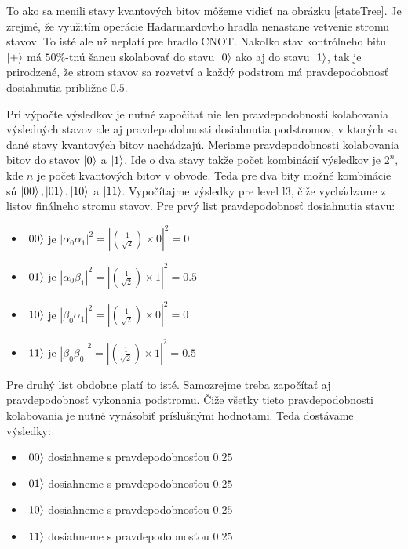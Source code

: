 To ako sa menili stavy kvantových bitov môžeme vidieť na obrázku
\ref{stateTree}. Je zrejmé, že využitím operácie Hadarmardovho hradla nenastane
vetvenie stromu stavov. To isté ale už neplatí pre hradlo CNOT. Nakoľko stav
kontrólneho bitu \(\ket{+}\) má \(50\%\)-tnú šancu skolabovať do stavu 
\(\ket{0}\) ako aj do stavu \(\ket{1}\), tak je prirodzené, že strom stavov 
sa rozvetví a každý podstrom má pravdepodobnosť dosiahnutia približne \(0.5\).

Pri výpočte výsledkov je nutné započítať nie len pravdepodobnosti kolabovania
výsledných stavov ale aj pravdepodobnosti dosiahnutia podstromov, v ktorých 
sa dané stavy kvantových bitov nachádzajú. Meriame pravdepodobnosti kolabovania
bitov do stavov \(\ket{0}\) a \(\ket{1}\). Ide o dva stavy takže počet
kombinácií výsledkov je \(2^n\), kde \(n\) je počet kvantových bitov v obvode.
Teda pre dva bity možné kombinácie sú \(\ket{00}, \ket{01}, \ket{10}\) a
\(\ket{11}\). Vypočítajme výsledky pre level l3, čiže vychádzame z listov 
finálneho stromu stavov. Pre prvý list pravdepodobnosť dosiahnutia stavu:

\begin{itemize}
    \item \(\ket{00}\) je \(|\alpha_0\alpha_1|^2 = |\binom{1}{\sqrt{2}} \times
0|^2 = 0\)
    \item \(\ket{01}\) je \(|\alpha_0\beta_1|^2 = |\binom{1}{\sqrt{2}} \times
1|^2 = 0.5\)
    \item \(\ket{10}\) je \(|\beta_0\alpha_1|^2 = |\binom{1}{\sqrt{2}} \times
0|^2 = 0\)
    \item \(\ket{11}\) je \(|\beta_0\beta_0|^2 = |\binom{1}{\sqrt{2}} \times
1|^2 = 0.5\)
\end{itemize}

Pre druhý list obdobne platí to isté. Samozrejme treba započítať aj
pravdepodobnosť vykonania podstromu. Čiže všetky tieto pravdepodobnosti
kolabovania je nutné vynásobiť príslušnými hodnotami. Teda dostávame výsledky:
\begin{itemize}
    \item \(\ket{00}\) dosiahneme s pravdepodobnosťou \(0.25\)
    \item \(\ket{01}\) dosiahneme s pravdepodobnosťou \(0.25\)
    \item \(\ket{10}\) dosiahneme s pravdepodobnosťou \(0.25\)
    \item \(\ket{11}\) dosiahneme s pravdepodobnosťou \(0.25\)
\end{itemize}
